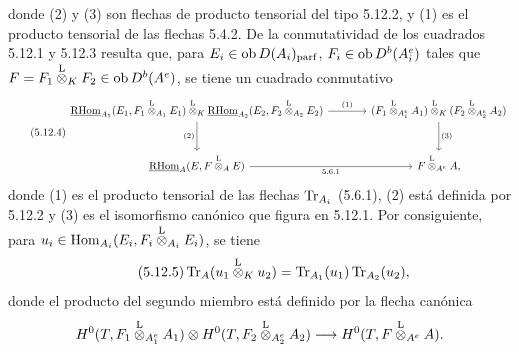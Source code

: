 donde (2) y (3) son flechas de producto tensorial del tipo 5.12.2, y (1) es el producto tensorial de las flechas 5.4.2. De la conmutatividad de los cuadrados 5.12.1 y 5.12.3 resulta que, para $E_i\in\operatorname{ob} D(A_i)_{\mathrm{parf}}$, $F_i\in\operatorname{ob} D^b(A_i^e)$ tales que $F=F_1\overset{\mathrm L}{\otimes}_KF_2\in\operatorname{ob} D^b(A^e)$, se tiene un cuadrado conmutativo
\begin{equation}\tag{5.12.4}
\begin{tikzcd}[column sep=large,row sep=large]
\uRHom_{A_1}(E_1,F_1\lten_{A_1}E_1)\lten_K\uRHom_{A_2}(E_2,F_2\lten_{A_2}E_2) \arrow[r,"(1)"] \arrow[d,"(2)"'] & (F_1\lten_{A_1^e}A_1)\lten_K(F_2\lten_{A_2^e}A_2) \arrow[d,"(3)"]\\
\uRHom_A(E,F\lten_AE) \arrow[r,"5.6.1"'] & F\lten_{A^e}A,
\end{tikzcd}
\end{equation}
donde (1) es el producto tensorial de las flechas $\operatorname{Tr}_{A_i}$ (5.6.1), (2) está definida por 5.12.2 y (3) es el isomorfismo canónico que figura en 5.12.1. Por consiguiente, para $u_i\in\operatorname{Hom}_{A_i}(E_i,F_i\overset{\mathrm L}{\otimes}_{A_i}E_i)$, se tiene
\begin{equation}\tag{5.12.5}
\operatorname{Tr}_A(u_1\overset{\mathrm L}{\otimes}_Ku_2)=\operatorname{Tr}_{A_1}(u_1)\operatorname{Tr}_{A_2}(u_2),
\end{equation}
donde el producto del segundo miembro está definido por la flecha canónica
\[
H^0(T,F_1\overset{\mathrm L}{\otimes}_{A_1^e}A_1)\otimes H^0(T,F_2\overset{\mathrm L}{\otimes}_{A_2^e}A_2)
\longrightarrow H^0(T,F\overset{\mathrm L}{\otimes}_{A^e}A).
\]
